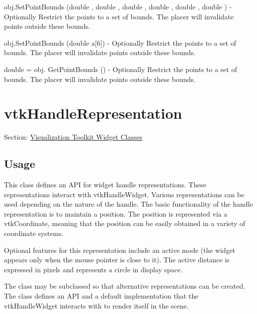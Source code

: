 \begin{DoxyItemize}
\item {\ttfamily obj.\-Set\-Point\-Bounds (double , double , double , double , double , double )} -\/ Optionally Restrict the points to a set of bounds. The placer will invalidate points outside these bounds.  
\item {\ttfamily obj.\-Set\-Point\-Bounds (double a\mbox{[}6\mbox{]})} -\/ Optionally Restrict the points to a set of bounds. The placer will invalidate points outside these bounds.  
\item {\ttfamily double = obj. Get\-Point\-Bounds ()} -\/ Optionally Restrict the points to a set of bounds. The placer will invalidate points outside these bounds.  
\end{DoxyItemize}\hypertarget{vtkwidgets_vtkhandlerepresentation}{}\section{vtk\-Handle\-Representation}\label{vtkwidgets_vtkhandlerepresentation}
Section\-: \hyperlink{sec_vtkwidgets}{Visualization Toolkit Widget Classes} \hypertarget{vtkwidgets_vtkxyplotwidget_Usage}{}\subsection{Usage}\label{vtkwidgets_vtkxyplotwidget_Usage}
This class defines an A\-P\-I for widget handle representations. These representations interact with vtk\-Handle\-Widget. Various representations can be used depending on the nature of the handle. The basic functionality of the handle representation is to maintain a position. The position is represented via a vtk\-Coordinate, meaning that the position can be easily obtained in a variety of coordinate systems.

Optional features for this representation include an active mode (the widget appears only when the mouse pointer is close to it). The active distance is expressed in pixels and represents a circle in display space.

The class may be subclassed so that alternative representations can be created. The class defines an A\-P\-I and a default implementation that the vtk\-Handle\-Widget interacts with to render itself in the scene.

